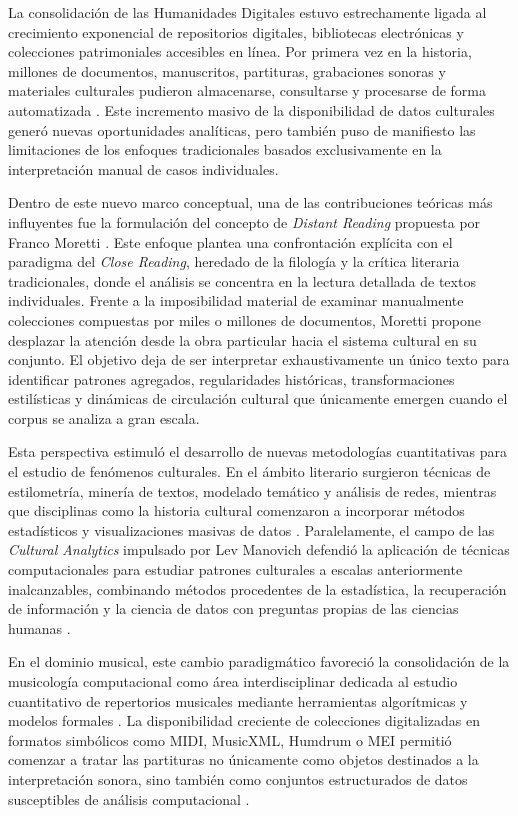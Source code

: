 La consolidación de las Humanidades Digitales estuvo estrechamente ligada al crecimiento exponencial de repositorios digitales, bibliotecas electrónicas y colecciones patrimoniales accesibles en línea. Por primera vez en la historia, millones de documentos, manuscritos, partituras, grabaciones sonoras y materiales culturales pudieron almacenarse, consultarse y procesarse de forma automatizada \citep{schreibman2004companion, burdick2012digital}. Este incremento masivo de la disponibilidad de datos culturales generó nuevas oportunidades analíticas, pero también puso de manifiesto las limitaciones de los enfoques tradicionales basados exclusivamente en la interpretación manual de casos individuales.

Dentro de este nuevo marco conceptual, una de las contribuciones teóricas más influyentes fue la formulación del concepto de \textit{Distant Reading} propuesta por Franco Moretti \citep{moretti2013distant}. Este enfoque plantea una confrontación explícita con el paradigma del \textit{Close Reading}, heredado de la filología y la crítica literaria tradicionales, donde el análisis se concentra en la lectura detallada de textos individuales. Frente a la imposibilidad material de examinar manualmente colecciones compuestas por miles o millones de documentos, Moretti propone desplazar la atención desde la obra particular hacia el sistema cultural en su conjunto. El objetivo deja de ser interpretar exhaustivamente un único texto para identificar patrones agregados, regularidades históricas, transformaciones estilísticas y dinámicas de circulación cultural que únicamente emergen cuando el corpus se analiza a gran escala.

Esta perspectiva estimuló el desarrollo de nuevas metodologías cuantitativas para el estudio de fenómenos culturales. En el ámbito literario surgieron técnicas de estilometría, minería de textos, modelado temático y análisis de redes, mientras que disciplinas como la historia cultural comenzaron a incorporar métodos estadísticos y visualizaciones masivas de datos \citep{jockers2013macroanalysis, ramsay2011reading}. Paralelamente, el campo de las \textit{Cultural Analytics} impulsado por Lev Manovich defendió la aplicación de técnicas computacionales para estudiar patrones culturales a escalas anteriormente inalcanzables, combinando métodos procedentes de la estadística, la recuperación de información y la ciencia de datos con preguntas propias de las ciencias humanas \citep{manovich2020cultural}.

En el dominio musical, este cambio paradigmático favoreció la consolidación de la musicología computacional como área interdisciplinar dedicada al estudio cuantitativo de repertorios musicales mediante herramientas algorítmicas y modelos formales \citep{cook2004computational, conklin1995multiple}. La disponibilidad creciente de colecciones digitalizadas en formatos simbólicos como MIDI, MusicXML, Humdrum o MEI permitió comenzar a tratar las partituras no únicamente como objetos destinados a la interpretación sonora, sino también como conjuntos estructurados de datos susceptibles de análisis computacional \citep{roland2002music, selfridge1997humdrum}.

